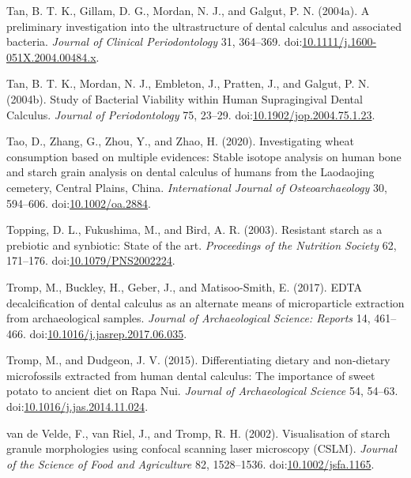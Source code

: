 \documentclass[utf8]{frontiers/frontiersSCNS}
\newlength{\cslhangindent}
\newlength{\cslentryspacingunit} %
\newenvironment{CSLReferences}[2] %
 {%
  \setlength{\parindent}{0pt}
  \ifodd #1
  \let\oldpar\par
  \def\par{\hangindent=\cslhangindent\oldpar}
  \fi
  \setlength{\parskip}{#2\cslentryspacingunit}
 }%
 {}
\begin{document}
\begin{CSLReferences}{1}{0}
\leavevmode{}%
Tan, B. T. K., Gillam, D. G., Mordan, N. J., and Galgut, P. N. (2004a). A preliminary investigation into the ultrastructure of dental calculus and associated bacteria. \emph{Journal of Clinical Periodontology} 31, 364--369. doi:\href{https://doi.org/10.1111/j.1600-051X.2004.00484.x}{10.1111/j.1600-051X.2004.00484.x}.

\leavevmode{}%
Tan, B. T. K., Mordan, N. J., Embleton, J., Pratten, J., and Galgut, P. N. (2004b). Study of {Bacterial Viability} within {Human Supragingival Dental Calculus}. \emph{Journal of Periodontology} 75, 23--29. doi:\href{https://doi.org/10.1902/jop.2004.75.1.23}{10.1902/jop.2004.75.1.23}.

\leavevmode{}%
Tao, D., Zhang, G., Zhou, Y., and Zhao, H. (2020). Investigating wheat consumption based on multiple evidences: {Stable} isotope analysis on human bone and starch grain analysis on dental calculus of humans from the {Laodaojing} cemetery, {Central Plains}, {China}. \emph{International Journal of Osteoarchaeology} 30, 594--606. doi:\href{https://doi.org/10.1002/oa.2884}{10.1002/oa.2884}.

\leavevmode{}%
Topping, D. L., Fukushima, M., and Bird, A. R. (2003). Resistant starch as a prebiotic and synbiotic: State of the art. \emph{Proceedings of the Nutrition Society} 62, 171--176. doi:\href{https://doi.org/10.1079/PNS2002224}{10.1079/PNS2002224}.

\leavevmode{}%
Tromp, M., Buckley, H., Geber, J., and Matisoo-Smith, E. (2017). {EDTA} decalcification of dental calculus as an alternate means of microparticle extraction from archaeological samples. \emph{Journal of Archaeological Science: Reports} 14, 461--466. doi:\href{https://doi.org/10.1016/j.jasrep.2017.06.035}{10.1016/j.jasrep.2017.06.035}.

\leavevmode{}%
Tromp, M., and Dudgeon, J. V. (2015). Differentiating dietary and non-dietary microfossils extracted from human dental calculus: The importance of sweet potato to ancient diet on {Rapa Nui}. \emph{Journal of Archaeological Science} 54, 54--63. doi:\href{https://doi.org/10.1016/j.jas.2014.11.024}{10.1016/j.jas.2014.11.024}.

\leavevmode{}%
van de Velde, F., van Riel, J., and Tromp, R. H. (2002). Visualisation of starch granule morphologies using confocal scanning laser microscopy ({CSLM}). \emph{Journal of the Science of Food and Agriculture} 82, 1528--1536. doi:\href{https://doi.org/10.1002/jsfa.1165}{10.1002/jsfa.1165}.


\end{CSLReferences}
\end{document}
